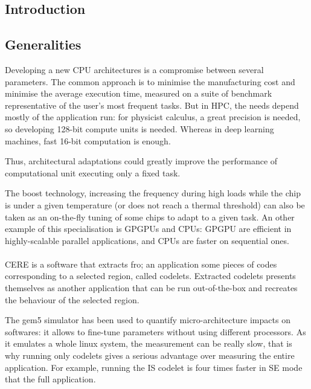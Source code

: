 \documentclass{article}
\begin{document}
\begin{multicols}{2}

\section{Introduction}
\subsection{Generalities}
Developing a new CPU architectures is a compromise between several parameters. The common approach is to minimise the manufacturing cost and minimise the average execution time, measured on a suite of benchmark representative of the user's most frequent tasks. But in HPC, the needs depend mostly of the application run: for physicist calculus, a great precision is needed, so developing 128-bit compute units is needed. Whereas in deep learning machines, fast 16-bit computation is enough.

Thus, architectural adaptations could greatly improve the performance of computational unit executing only a fixed task. 

The boost technology, increasing the frequency during high loads while the chip is under a given temperature (or does not reach a thermal threshold) can also be taken as an on-the-fly tuning of some chips to adapt to a given task. An other example of this specialisation is GPGPUs and CPUs: GPGPU are efficient in highly-scalable parallel applications, and CPUs are faster on sequential ones.



\paragraph{}
CERE is a software that extracts fro; an application some pieces of codes corresponding to a selected region, called codelets. Extracted codelets presents themselves as another application that can be run out-of-the-box and recreates the behaviour of the selected region.


The gem5 simulator\cite{gem5-sim} has been used to quantify micro-architecture impacts on softwares: it allows to fine-tune parameters without using different processors. As it emulates a whole linux system, the measurement can be really slow, that is why running only codelets gives a serious advantage over measuring the entire application. For example, running the IS codelet is four times faster in SE mode that the full application.



\end{multicols}
\end{document}
